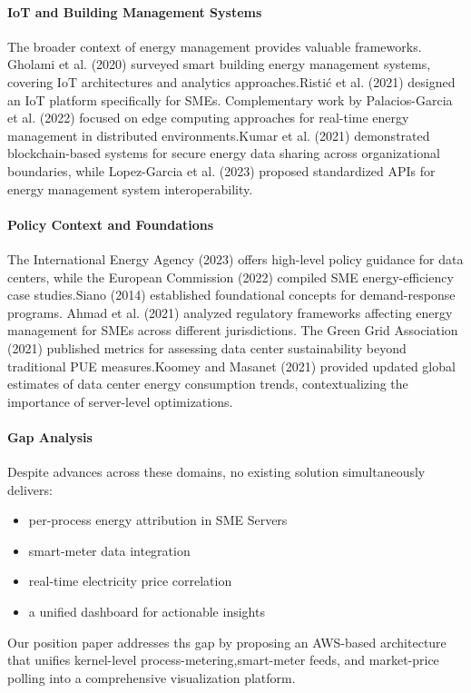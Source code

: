 \paragraph{IoT and Building Management Systems}
The broader context of energy management provides valuable frameworks.
Gholami et al. (2020) surveyed smart building energy management systems, covering IoT architectures
and analytics approaches.Ristić et al. (2021) designed an IoT platform specifically for SMEs.
Complementary work by Palacios-Garcia et al. (2022) focused on edge computing approaches for
real-time energy management in distributed environments.Kumar et al. (2021) demonstrated
blockchain-based systems for secure energy data sharing across organizational boundaries,
while Lopez-Garcia et al. (2023) proposed standardized APIs for energy management system
interoperability.
\cite{gholami2020energymanagement,ristic2021iotenergymanagement,palacios2022edge,lopez2023standardized}

\paragraph{Policy Context and Foundations}
The International Energy Agency (2023) offers high-level policy guidance for data centers, while
the European Commission (2022) compiled SME energy-efficiency case studies.Siano (2014) established
foundational concepts for demand-response programs. Ahmad et al. (2021) analyzed regulatory
frameworks affecting energy management for SMEs across different jurisdictions. The Green Grid
Association (2021) published metrics for assessing data center sustainability beyond traditional
PUE measures.Koomey and Masanet (2021) provided updated global estimates of data center energy
consumption trends, contextualizing the importance of server-level optimizations.
\cite{iea2023datacenters,ec2022energyefficiencysmes,siano2014demandresponse,ahmad2021regulatory,greengrid2021beyond,koomey2021does}

\paragraph{Gap Analysis}
Despite advances across these domains, no existing solution simultaneously delivers:

\begin{itemize}
	\item per-process energy attribution in SME Servers
	\item smart-meter data integration
	\item real-time electricity price correlation
	\item a unified dashboard for actionable insights
\end{itemize}

Our position paper addresses ths gap by proposing an AWS-based architecture that unifies
kernel-level process-metering,smart-meter feeds, and market-price polling into a comprehensive
visualization platform.